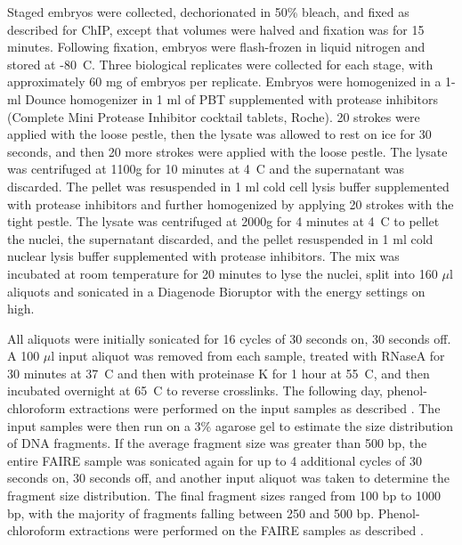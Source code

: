 Staged embryos were collected, dechorionated in 50\% bleach, and fixed as described for ChIP, except that volumes were halved and fixation was for 15 minutes. Following fixation, embryos were flash-frozen in liquid nitrogen and stored at -80\degree~C. Three biological replicates were collected for each stage, with approximately 60 mg of embryos per replicate. Embryos were homogenized in a 1-ml Dounce homogenizer in 1 ml of PBT supplemented with protease inhibitors (Complete Mini Protease Inhibitor cocktail tablets, Roche). 20 strokes were applied with the loose pestle, then the lysate was allowed to rest on ice for 30 seconds, and then 20 more strokes were applied with the loose pestle. The lysate was centrifuged at 1100g for 10 minutes at 4\degree~C and the supernatant was discarded. The pellet was resuspended in 1 ml cold cell lysis buffer supplemented with protease inhibitors and further homogenized by applying 20 strokes with the tight pestle. The lysate was centrifuged at 2000g for 4 minutes at 4\degree~C to pellet the nuclei, the supernatant discarded, and the pellet resuspended in 1 ml cold nuclear lysis buffer supplemented with protease inhibitors. The mix was incubated at room temperature for 20 minutes to lyse the nuclei, split into 160 \(\mu\)l aliquots and sonicated in a Diagenode Bioruptor with the energy settings on high.

All aliquots were initially sonicated for 16 cycles of 30 seconds on, 30 seconds off. A 100 \(\mu\)l input aliquot was removed from each sample, treated with RNaseA for 30 minutes at 37\degree~C and then with proteinase K for 1 hour at 55\degree~C, and then incubated overnight at 65\degree~C to reverse crosslinks. The following day, phenol-chloroform extractions were performed on the input samples as described \citep{simon_using_2012}. The input samples were then run on a 3\% agarose gel to estimate the size distribution of DNA fragments. If the average fragment size was greater than 500 bp, the entire FAIRE sample was sonicated again for up to 4 additional cycles of 30 seconds on, 30 seconds off, and another input aliquot was taken to determine the fragment size distribution. The final fragment sizes ranged from 100 bp to 1000 bp, with the majority of fragments falling between 250 and 500 bp. Phenol-chloroform extractions were performed on the FAIRE samples as described \citep{simon_using_2012}.

